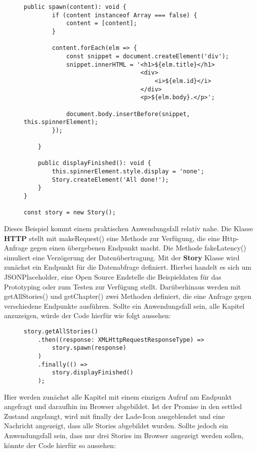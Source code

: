 \begin{figure}[H]
\begin{lstlisting}[basicstyle=\small]
    public spawn(content): void {
        if (content instanceof Array === false) {
            content = [content];
        }

        content.forEach(elm => {
            const snippet = document.createElement('div');
            snippet.innerHTML = '<h1>${elm.title}</h1>
                                 <div>
                                     <i>${elm.id}</i>
                                 </div>
                                 <p>${elm.body}.</p>';

            document.body.insertBefore(snippet, this.spinnerElement);
        });

    }

    public displayFinished(): void {
        this.spinnerElement.style.display = 'none';
        Story.createElement('All done!');
    }
}

const story = new Story();
\end{lstlisting}
\end{figure}

\noindent
Dieses Beispiel kommt einem praktischen Anwendungsfall relativ nahe. Die Klasse \textbf{HTTP} stellt mit  makeRequest() eine Methode zur Verfügung, die eine Http-Anfrage gegen einen übergebenen Endpunkt macht. Die Methode fakeLatency() simuliert eine Verzögerung der Datenübertragung. Mit der \textbf{Story} Klasse wird zunächst ein Endpunkt für die Datenabfrage definiert. Hierbei handelt es sich um JSONPlaceholder, eine Open Source Endstelle die Beispieldaten für das Prototyping oder zum Testen zur Verfügung stellt. Darüberhinaus werden mit getAllStories() und getChapter() zwei Methoden definiert, die eine Anfrage gegen verschiedene Endpunkte ausführen. Sollte ein Anwendungsfall sein, alle Kapitel anzuzeigen, würde der Code hierfür wie folgt aussehen:

\begin{figure}[H]
\begin{lstlisting}[basicstyle=\small]
story.getAllStories()
    .then((response: XMLHttpRequestResponseType) =>
        story.spawn(response)
    )
    .finally(() =>
        story.displayFinished()
    );
\end{lstlisting}
\end{figure}

\noindent
Hier werden zunächst alle Kapitel mit einem einzigen Aufruf am Endpunkt angefragt und daraufhin im Browser abgebildet. Ist der Promise in den settled Zustand angelangt, wird mit finally der Lade-Icon ausgeblendet und eine Nachricht angezeigt, dass alle Stories abgebildet wurden. Sollte jedoch ein Anwendungsfall sein, dass nur drei Stories im Browser angezeigt werden sollen, könnte der Code hierfür so aussehen: 

